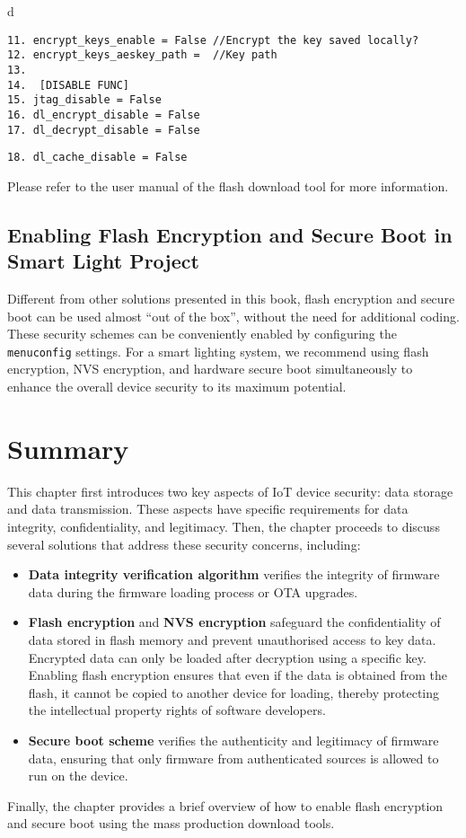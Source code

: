 \documentclass[a4paper,12pt]{book}
\begin{document}
\begin{codebloc}
\begin{tabular}{d}
\vspace{2pt}
\begin{verbatim}
11. encrypt_keys_enable = False //Encrypt the key saved locally?
12. encrypt_keys_aeskey_path =  //Key path
13.	
14.  [DISABLE FUNC]
15. jtag_disable = False
16. dl_encrypt_disable = False
17. dl_decrypt_disable = False
\end{verbatim}
\verb|18. dl_cache_disable = False|
\end{tabular}
\end{codebloc}

Please refer to the user manual of the flash download tool for more information.


\subsection{Enabling Flash Encryption and Secure Boot in Smart Light Project}
Different from other solutions presented in this book, flash encryption and secure boot can be used almost “out of the box”, without the need for additional coding. These security schemes can be conveniently enabled by configuring the \verb|menuconfig| settings. For a smart lighting system, we recommend using flash encryption, NVS encryption, and hardware secure boot simultaneously to enhance the overall device security to its maximum potential.

\section{Summary}
This chapter first introduces two key aspects of IoT device security: data storage and data transmission. These aspects have specific requirements for data integrity, confidentiality, and legitimacy. Then, the chapter proceeds to discuss several solutions that address these security concerns, including:

\begin{itemize}[leftmargin=1.5em]
    \item \textbf{Data integrity verification algorithm} verifies the integrity of firmware data during the firmware loading process or OTA upgrades. 
    \item \textbf{Flash encryption} and \textbf{NVS encryption} safeguard the confidentiality of data stored in flash memory and prevent unauthorised access to key data. Encrypted data can only be loaded after decryption using a specific key. Enabling flash encryption ensures that even if the data is obtained from the flash, it cannot be copied to another device for loading, thereby protecting the intellectual property rights of software developers. 
    \item \textbf{Secure boot scheme} verifies the authenticity and legitimacy of firmware data, ensuring that only firmware from authenticated sources is allowed to run on the device.
\end{itemize}

Finally, the chapter provides a brief overview of how to enable flash encryption and secure boot using the mass production download tools.
\end{document}
